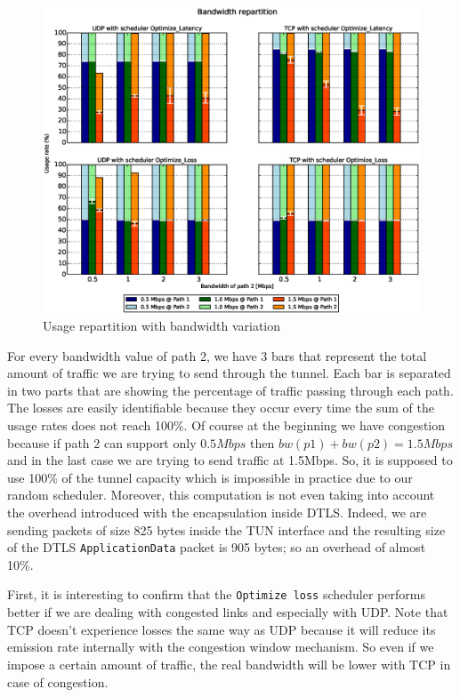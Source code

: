 \begin{figure}[!h]
\centering
\includegraphics[width=\textwidth]{images/xp/graph1.eps}
\caption{Usage repartition with bandwidth variation}
\label{fig:dynbw}
\end{figure}


For every bandwidth value of path 2, we have 3 bars that represent the total amount of traffic we are trying to send through the tunnel. Each bar is separated in two parts that are showing the percentage of traffic passing through each path. The losses are easily identifiable because they occur every time the sum of the usage rates does not reach 100\%. Of course at the beginning we have congestion because if path 2 can support only $0.5Mbps$ then $bw(p1) + bw(p2) = 1.5Mbps$ and in the last case we are trying to send traffic at 1.5Mbps. So, it is supposed to use 100\% of the tunnel capacity which is impossible in practice due to our random scheduler. Moreover, this computation is not even taking into account the overhead introduced with the encapsulation inside DTLS. Indeed, we are sending packets of size 825 bytes inside the TUN interface and the resulting size of the DTLS \texttt{ApplicationData} packet is 905 bytes; so an overhead of almost 10\%.

First, it is interesting to confirm that the \texttt{Optimize loss} scheduler performs better if we are dealing with congested links and especially with UDP. Note that TCP doesn't experience losses the same way as UDP because it will reduce its emission rate internally with the congestion window mechanism. So even if we impose a certain amount of traffic, the real bandwidth will be lower with TCP in case of congestion.

